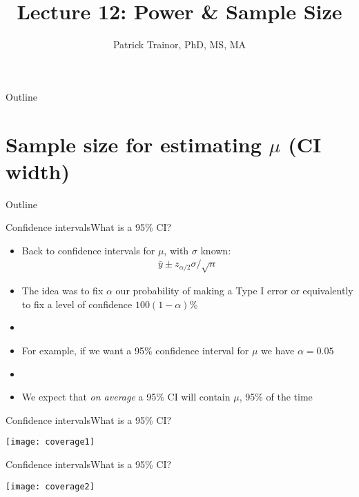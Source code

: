 \documentclass[xcolor=dvipsnames]{beamer}
\title[Lecture 12]{Lecture 12: Power \& Sample Size}
\author[Patrick Trainor]{Patrick Trainor, PhD, MS, MA}
\institute[NMSU]{New Mexico State University}
\date{}
\begin{document}
\begin{frame}
\maketitle
\end{frame}

\begin{frame}{Outline}
\tableofcontents[hideallsubsections]
\end{frame}

\section{Sample size for estimating $\mu$ (CI width)}

\begin{frame}{Outline}
\tableofcontents[currentsection,subsectionstyle=show/shaded/hide]
\end{frame}

\begin{frame}{Confidence intervals}{What is a 95\% CI?}
\begin{itemize}
	\item Back to confidence intervals for $\mu$, with $\sigma$ known:
	\begin{gather*}
		\bar{y}\pm z_{\alpha/2} \sigma / \sqrt{n}
	\end{gather*}  \pause
	\item The idea was to fix $\alpha$ our probability of making a Type I error or equivalently to fix a level of confidence $100(1-\alpha)\%$ \pause
	\item[]
	\item For example, if we want a 95\% confidence interval for $\mu$ we have $\alpha = 0.05$  \pause
	\item[]
	\item We expect that \emph{on average} a 95\% CI will contain $\mu$,  95\% of the time
\end{itemize}
\end{frame}

\begin{frame}{Confidence intervals}{What is a 95\% CI?}
	\begin{center}
		\texttt{[image: coverage1]}
	\end{center}
\end{frame}

\begin{frame}{Confidence intervals}{What is a 95\% CI?}
\begin{center}
	\texttt{[image: coverage2]}
\end{center}
\end{frame}
\end{document}
